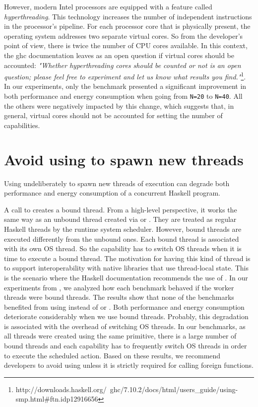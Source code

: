 However, modern Intel processors are equipped with a feature called \emph{hyperthreading}. This technology increases the number of independent instructions in the processor's pipeline. For each processor core that is physically present, the operating system addresses two separate virtual cores. So from the developer's point of view, there is twice the number of CPU cores available. In this context, the \ac{ghc} documentation leaves as an open question if virtual cores should be accounted: \emph{"Whether hyperthreading cores should be counted or not is an open question; please feel free to experiment and let us know what results you find."}\footnote{http://downloads.haskell.org/~ghc/7.10.2/docs/html/users\_guide/using-smp.html\#ftn.idp12916656}. In our experiments, only the \spectral benchmark presented a significant improvement in both performance and energy consumption when going from \texttt{N=20} to \texttt{N=40}. All the others were negatively impacted by this change, which suggests that, in general, virtual cores should not be accounted for setting the number of capabilities.


\section{Avoid using \forkOS to spawn new threads}
 Using \forkOS undeliberately to spawn new threads of execution can degrade both performance and energy consumption of a concurrent Haskell program.
\newline

 A call to \forkOS creates a bound thread. From a high-level perspective, it works the same way as an unbound thread created via \forkIO or \forkOn. They are treated as regular Haskell threads by the runtime system scheduler. However, bound threads are executed differently from the unbound ones. Each bound thread is associated with its own OS thread. So the capability has to switch OS threads when it is time to execute a bound thread. The motivation for having this kind of thread is to support interoperability with native libraries that use thread-local state. This is the scenario where the Haskell documentation recommends the use of \forkOS. In our experiments from , we analyzed how each benchmark behaved if the worker threads were bound threads. The results show that none of the benchmarks benefited from using \forkOS instead of \forkIO or \forkOn. Both performance and energy consumption deteriorate considerably when we use bound threads. Probably, this degradation is associated with the overhead of switching OS threads. In our benchmarks, as all threads were created using the same primitive, there is a large number of bound threads and each capability has to frequently switch OS threads in order to execute the scheduled action. Based on these results, we recommend developers to avoid using \forkOS unless it is strictly required for calling foreign functions.
